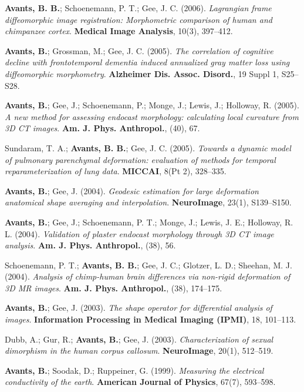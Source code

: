 \documentclass[10pt,letterpaper]{article}
\begin{document}
\begin{enumerate}
{  \item \textbf{Avants, B. B.}; Schoenemann, P. T.; Gee, J. C. (2006). \textit{Lagrangian frame diffeomorphic image registration: Morphometric comparison of human and chimpanzee cortex}. \textbf{Medical Image Analysis}, 10(3), 397--412.
  \item \textbf{Avants, B.}; Grossman, M.; Gee, J. C. (2005). \textit{The correlation of cognitive decline with frontotemporal dementia induced annualized gray matter loss using diffeomorphic morphometry}. \textbf{Alzheimer Dis. Assoc. Disord.}, 19 Suppl 1, S25--S28.
  \item \textbf{Avants, B.}; Gee, J.; Schoenemann, P.; Monge, J.; Lewis, J.; Holloway, R. (2005). \textit{A new method for assessing endocast morphology: calculating local curvature from 3D CT images}. \textbf{Am. J. Phys. Anthropol.}, (40), 67.
  \item Sundaram, T. A.; \textbf{Avants, B. B.}; Gee, J. C. (2005). \textit{Towards a dynamic model of pulmonary parenchymal deformation: evaluation of methods for temporal reparameterization of lung data}. \textbf{MICCAI}, 8(Pt 2), 328--335.
  \item \textbf{Avants, B.}; Gee, J. (2004). \textit{Geodesic estimation for large deformation anatomical shape averaging and interpolation}. \textbf{NeuroImage}, 23(1), S139--S150.
  \item \textbf{Avants, B.}; Gee, J.; Schoenemann, P. T.; Monge, J.; Lewis, J. E.; Holloway, R. L. (2004). \textit{Validation of plaster endocast morphology through 3D CT image analysis}. \textbf{Am. J. Phys. Anthropol.}, (38), 56.
  \item Schoenemann, P. T.; \textbf{Avants, B. B.}; Gee, J. C.; Glotzer, L. D.; Sheehan, M. J. (2004). \textit{Analysis of chimp-human brain differences via non-rigid deformation of 3D MR images}. \textbf{Am. J. Phys. Anthropol.}, (38), 174--175.
  \item \textbf{Avants, B.}; Gee, J. (2003). \textit{The shape operator for differential analysis of images}. \textbf{Information Processing in Medical Imaging (IPMI)}, 18, 101--113.
  \item Dubb, A.; Gur, R.; \textbf{Avants, B.}; Gee, J. (2003). \textit{Characterization of sexual dimorphism in the human corpus callosum}. \textbf{NeuroImage}, 20(1), 512--519.
  \item \textbf{Avants, B.}; Soodak, D.; Ruppeiner, G. (1999). \textit{Measuring the electrical conductivity of the earth}. \textbf{American Journal of Physics}, 67(7), 593--598.
}
\end{enumerate}
\end{document}
